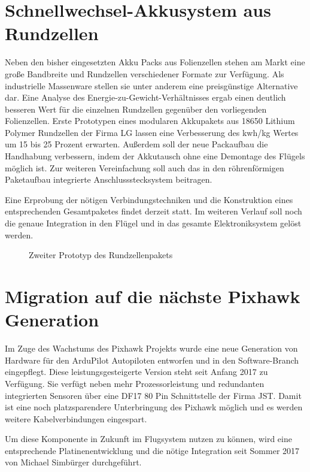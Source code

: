\section{Schnellwechsel-Akkusystem aus Rundzellen}

Neben den bisher eingesetzten Akku Packs aus Folienzellen stehen am Markt eine große Bandbreite und Rundzellen verschiedener Formate zur Verfügung. Als industrielle Massenware stellen sie  unter anderem eine preisgünstige Alternative dar.
Eine Analyse des Energie-zu-Gewicht-Verhältnisses ergab einen deutlich besseren Wert für die einzelnen Rundzellen gegenüber den vorliegenden Folienzellen. Erste Prototypen eines modularen Akkupakets aus 18650 Lithium Polymer Rundzellen der Firma LG lassen eine Verbesserung des kwh/kg Wertes um 15 bis 25 Prozent erwarten.
Außerdem soll der neue Packaufbau die Handhabung verbessern, indem der Akkutausch ohne eine Demontage des Flügels möglich ist. Zur weiteren Vereinfachung soll auch das in den röhrenförmigen Paketaufbau integrierte Anschlussstecksystem beitragen.

Eine Erprobung der nötigen Verbindungstechniken und die Konstruktion eines entsprechenden Gesamtpaketes findet derzeit statt.
Im weiteren Verlauf soll noch die genaue Integration in den Flügel und in das gesamte Elektroniksystem gelöst werden.

\begin{figure}[H]
\centering
{}
\caption{Zweiter Prototyp des Rundzellenpakets} 
\label{fig:Zweiter Prototyp der Rundzellenpakets}
\end{figure}


\section{Migration auf die nächste Pixhawk Generation}

Im Zuge des Wachstums des Pixhawk Projekts wurde eine neue Generation von Hardware für den ArduPilot Autopiloten entworfen und in den Software-Branch eingepflegt. Diese leistungsgesteigerte Version steht seit Anfang 2017 zu Verfügung.
Sie verfügt neben mehr Prozessorleistung und redundanten integrierten Sensoren über eine DF17 80 Pin Schnittstelle der Firma JST. Damit ist eine noch platzsparendere Unterbringung des Pixhawk möglich und es werden weitere Kabelverbindungen eingespart.

Um diese Komponente in Zukunft im Flugsystem nutzen zu können, wird eine entsprechende Platinenentwicklung und die nötige Integration seit Sommer 2017 von Michael Simbürger durchgeführt\cite{Simburger}.

